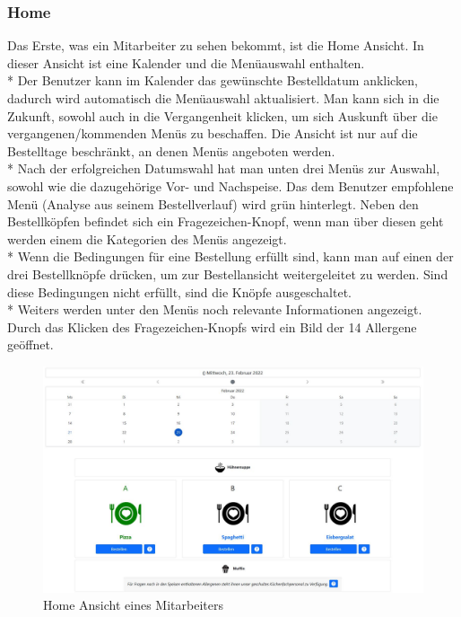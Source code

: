 \subsubsection {Home}
\label{sec:MitHome}
Das Erste, was ein Mitarbeiter zu sehen bekommt, ist die Home Ansicht. In dieser Ansicht ist eine Kalender und die Menüauswahl enthalten. \\*
Der Benutzer kann im Kalender das gewünschte Bestelldatum anklicken, dadurch wird automatisch die Menüauswahl aktualisiert. Man kann sich in die Zukunft, sowohl auch 
in die Vergangenheit klicken, um sich Auskunft über die vergangenen/kommenden Menüs zu beschaffen. Die Ansicht ist nur auf die Bestelltage beschränkt, an denen Menüs angeboten werden.\\*
Nach der erfolgreichen Datumswahl hat man unten drei Menüs zur Auswahl, sowohl wie die dazugehörige Vor- und Nachspeise. Das dem Benutzer empfohlene Menü (Analyse aus seinem Bestellverlauf) wird grün hinterlegt.
Neben den Bestellköpfen befindet sich ein Fragezeichen-Knopf, wenn man über diesen geht werden einem die Kategorien des Menüs angezeigt.
\\* Wenn die Bedingungen für eine Bestellung erfüllt sind,
kann man auf einen der drei Bestellknöpfe drücken, um zur Bestellansicht weitergeleitet zu werden. Sind diese Bedingungen nicht erfüllt, sind die Knöpfe ausgeschaltet. \\*
Weiters werden unter den Menüs noch relevante Informationen angezeigt. Durch das Klicken des Fragezeichen-Knopfs wird ein Bild der 14 Allergene geöffnet.

\begin{figure}[htp]
    \centering
    \includegraphics[scale=0.35]{pics/mitarbeiter-home.JPG}
    \caption{Home Ansicht eines Mitarbeiters}
    \label{fig:impl:HomeMitarbeiter}
\end{figure}

